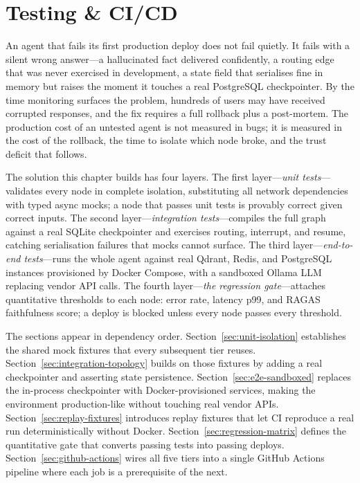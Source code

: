 
\chapter{Testing \& CI/CD}
\label{chap:testing-cicd}

An agent that fails its first production deploy does not fail quietly.
It fails with a silent wrong answer---a hallucinated fact delivered
confidently, a routing edge that was never exercised in development, a
state field that serialises fine in memory but raises 
the moment it touches a real PostgreSQL checkpointer.
By the time monitoring surfaces the problem, hundreds of users may have
received corrupted responses, and the fix requires a full rollback plus
a post-mortem.
The production cost of an untested agent is not measured in bugs; it is
measured in the cost of the rollback, the time to isolate which node
broke, and the trust deficit that follows.

The solution this chapter builds has four layers.
The first layer---\emph{unit tests}---validates every node in complete
isolation, substituting all network dependencies with typed async mocks;
a node that passes unit tests is provably correct given correct inputs.
The second layer---\emph{integration tests}---compiles the full graph
against a real SQLite checkpointer and exercises routing, interrupt, and
resume, catching serialisation failures that mocks cannot surface.
The third layer---\emph{end-to-end tests}---runs the whole agent against
real Qdrant, Redis, and PostgreSQL instances provisioned by Docker
Compose, with a sandboxed Ollama LLM replacing vendor API calls.
The fourth layer---\emph{the regression gate}---attaches quantitative
thresholds to each node: error rate, latency p99, and RAGAS faithfulness
score; a deploy is blocked unless every node passes every threshold.

The sections appear in dependency order.
Section~\ref{sec:unit-isolation} establishes the shared mock fixtures
that every subsequent tier reuses.
Section~\ref{sec:integration-topology} builds on those fixtures by
adding a real checkpointer and asserting state persistence.
Section~\ref{sec:e2e-sandboxed} replaces the in-process checkpointer
with Docker-provisioned services, making the environment production-like
without touching real vendor APIs.
Section~\ref{sec:replay-fixtures} introduces replay fixtures that let
CI reproduce a real run deterministically without Docker.
Section~\ref{sec:regression-matrix} defines the quantitative gate that
converts passing tests into passing deploys.
Section~\ref{sec:github-actions} wires all five tiers into a single
GitHub Actions pipeline where each job is a prerequisite of the next.

